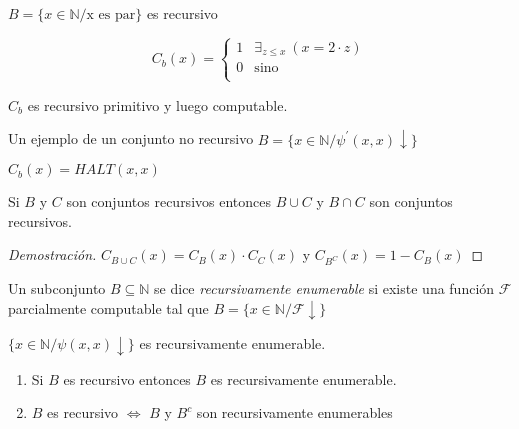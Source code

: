\begin{example}
$B = \{ x \in \mathbb{N} / \text{x es par} \}$ es recursivo
 
\[
C_{b}(x) =
\begin{cases}
1		&\exists_{z \leq x} \ (x = 2 \cdot z)		\\
0		&\text{sino}								\\
\end{cases}
\]
 
$C_b$ es recursivo primitivo y luego computable.
\end{example}
 
\begin{example}
Un ejemplo de un conjunto no recursivo $B = \{ x \in \mathbb{N} / \psi^{\prime}(x, x) \downarrow \}$
 
$C_b(x) = HALT(x, x)$
\end{example}
 
\begin{proposition}
Si $B$ y $C$ son conjuntos recursivos entonces $B \cup C$ y $B \cap C$ son conjuntos recursivos.
\end{proposition}
 
\begin{proof}[Demostraci\'on]
$C_{B \cup C}(x) = C_B(x) \cdot C_C(x)$ y $C_{B^{C}}(x) = 1 - C_B(x)$
\end{proof}
 
\begin{definition}
Un subconjunto $B \subseteq \mathbb{N}$ se dice \textit{recursivamente enumerable} si existe una funci\'on $\mathcal{F}$ parcialmente computable tal que $B = \{ x \in \mathbb{N} / \mathcal{F} \downarrow \}$
\end{definition}
 
\begin{example}
$\{ x \in \mathbb{N} / \psi(x, x) \downarrow \}$ es recursivamente enumerable.
\end{example}
 
 
\begin{proposition}
\hfill
\begin{enumerate}
	\item Si $B$ es recursivo entonces $B$ es recursivamente enumerable.
	\item $B$ es recursivo $\iff$ $B$ y $B^{c}$ son recursivamente enumerables
\end{enumerate}
\end{proposition}
 
